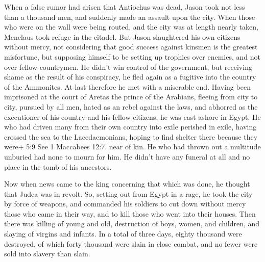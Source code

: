  When a false rumor had arisen that Antiochus was dead,
Jason took not less than a thousand men, and suddenly made an assault
upon the city. When those who were on the wall were being routed, and
the city was at length nearly taken, Menelaus took refuge in the
citadel.  But Jason slaughtered his own citizens without
mercy, not considering that good success against kinsmen is the greatest
misfortune, but supposing himself to be setting up trophies over
enemies, and not over fellow-countrymen.  He didn't win
control of the government, but receiving shame as the result of his
conspiracy, he fled again as a fugitive into the country of the
Ammonites.  At last therefore he met with a miserable end.
Having been imprisoned at the court of Aretas the prince of the
Arabians, fleeing from city to city, pursued by all men, hated as an
rebel against the laws, and abhorred as the executioner of his country
and his fellow citizens, he was cast ashore in Egypt.  He
who had driven many from their own country into exile perished in exile,
having crossed the sea to the Lacedaemonians, hoping to find shelter
there because they were+ 5:9 See 1 Maccabees 12:7. near of kin.
 He who had thrown out a multitude unburied had none to
mourn for him. He didn't have any funeral at all and no place in the
tomb of his ancestors.

 Now when news came to the king concerning that which was
done, he thought that Judea was in revolt. So, setting out from Egypt in
a rage, he took the city by force of weapons,  and
commanded his soldiers to cut down without mercy those who came in their
way, and to kill those who went into their houses.  Then
there was killing of young and old, destruction of boys, women, and
children, and slaying of virgins and infants.  In a total
of three days, eighty thousand were destroyed, of which forty thousand
were slain in close combat, and no fewer were sold into slavery than
slain.

